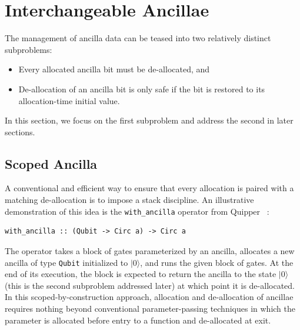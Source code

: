 \documentclass[sigplan,10pt,review,anonymous]{acmart}
\newcommand{\ket}[1]{|#1\rangle}
\begin{document}
\section{Interchangeable Ancillae}
\label{sec:dyn}

The management of ancilla data can be teased into two relatively
distinct subproblems:
\begin{itemize}
\item Every allocated ancilla bit must be de-allocated, and
\item De-allocation of an ancilla bit is only safe if the bit is
  restored to its allocation-time initial value.
\end{itemize}
In this section, we focus on the first subproblem and address the
second in later sections.

\subsection{Scoped Ancilla}

A conventional and efficient way to ensure that every allocation is
paired with a matching de-allocation is to impose a stack
discipline. An illustrative demonstration of this idea is the
\verb|with_ancilla| operator from
Quipper~\cite{Green:2013:QSQ:2491956.2462177} :
\begin{verbatim}
with_ancilla :: (Qubit -> Circ a) -> Circ a
\end{verbatim}
The operator takes a block of gates parameterized by an ancilla,
allocates a new ancilla of type \verb|Qubit| initialized to $\ket{0}$,
and runs the given block of gates. At the end of its execution, the
block is expected to return the ancilla to the state $\ket{0}$ (this
is the second subproblem addressed later) at which point it is
de-allocated. In this scoped-by-construction approach, allocation and
de-allocation of ancillae requires nothing beyond conventional
parameter-passing techniques in which the parameter is allocated
before entry to a function and de-allocated at exit.
\end{document}
